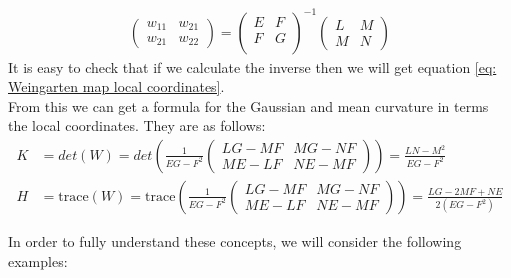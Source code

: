 \documentclass{article}
\theoremstyle{plain}
\theoremstyle{definition}
\theoremstyle{remark}
\begin{document}
\begin{align*}
    \begin{pmatrix}
        w_{11} & w_{21} \\
        w_{21} & w_{22}
    \end{pmatrix} =
    \begin{pmatrix}
        E & F \\
        F & G \\
    \end{pmatrix}^{-1}
    \begin{pmatrix}
        L & M \\
        M & N
    \end{pmatrix}
\end{align*}
It is easy to check that if we calculate the inverse then we will get equation \ref{eq: Weingarten map local coordinates}. \\

From this we can get a formula for the Gaussian and mean curvature in terms the local coordinates. They are as follows:
\begin{align*}
    K & = det(W) = det\left( \frac{1}{EG-F^2} \begin{pmatrix}
        LG - MF & MG - NF \\
        ME - LF & NE- MF
    \end{pmatrix} \right) = \frac{LN-M^2}{EG-F^2}                        \\
    H & = \text{trace}(W) = \text{trace}\left(\frac{1}{EG-F^2} \begin{pmatrix}
        LG - MF & MG - NF \\
        ME - LF & NE- MF
    \end{pmatrix} \right) = \frac{LG-2MF+NE}{2(EG-F^2)}
\end{align*}

In order to fully understand these concepts, we will consider the following examples:
\end{document}
